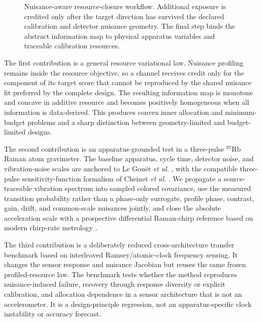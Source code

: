\begin{figure}[t]
\centering
{}
\caption{Nuisance-aware resource-closure workflow. Additional exposure is credited only after the target direction has survived the declared calibration and detector nuisance geometry. The final step binds the abstract information map to physical apparatus variables and traceable calibration resources.}
\label{fig:workflow}
\end{figure}

The first contribution is a general resource variational law. Nuisance profiling remains inside the resource objective, so a channel receives credit only for the component of its target score that cannot be reproduced by the shared nuisance fit preferred by the complete design. The resulting information map is monotone and concave in additive resource and becomes positively homogeneous when all information is data-derived. This produces convex inner allocation and minimum-budget problems and a sharp distinction between geometry-limited and budget-limited designs.

The second contribution is an apparatus-grounded test in a three-pulse $^{87}$Rb Raman atom gravimeter. The baseline apparatus, cycle time, detector noise, and vibration-noise scales are anchored to Le Gou\"et \emph{et al.} \cite{LeGouet2008}, with the compatible three-pulse sensitivity-function formalism of Cheinet \emph{et al.} \cite{Cheinet2008}. We propagate a source-traceable vibration spectrum into sampled colored covariance, use the measured transition probability rather than a phase-only surrogate, profile phase, contrast, gain, drift, and common-scale nuisances jointly, and close the absolute acceleration scale with a prospective differential Raman-chirp reference based on modern chirp-rate metrology \cite{Zhang2025}.

The third contribution is a deliberately reduced cross-architecture transfer benchmark based on interleaved Ramsey/atomic-clock frequency sensing. It changes the sensor response and nuisance Jacobian but reuses the same frozen profiled-resource law. The benchmark tests whether the method reproduces nuisance-induced failure, recovery through response diversity or explicit calibration, and allocation dependence in a sensor architecture that is not an accelerometer. It is a design-principle regression, not an apparatus-specific clock instability or accuracy forecast.

